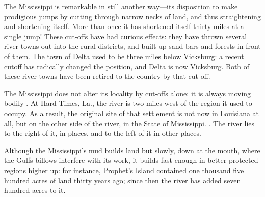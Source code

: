 \documentclass[../../../demo.tex]{novelettesubdoc}
\begin{document}
The Mississippi is remarkable in still another way---its disposition to
make prodigious jumps by cutting through narrow necks of land, and thus
straightening and shortening itself. More than once it has shortened
itself thirty miles at a single jump! These cut-offs have had curious
effects: they have thrown several river towns out into the rural
districts, and built up sand bars and forests in front of them. The town
of Delta used to be three miles below Vicksburg: a recent cutoff has
radically changed the position, and Delta is now 
Vicksburg. Both of these river towns have been retired to the country by that
cut-off.

The Mississippi does not alter its locality by cut-offs alone: it
is always moving bodily . At Hard Times, La., the river is two
miles west of the region it used to occupy. As a result, the original site of
that settlement is not now in Louisiana at all, but on the other side of
the river, in the State of Mississippi. . The river lies to the right of it, in places, and to the
left of it in other places.

Although the Mississippi's mud builds land but slowly, down at the
mouth, where the Gulfs billows interfere with its work, it builds fast
enough in better protected regions higher up: for instance, Prophet's
Island contained one thousand five hundred acres of land thirty years
ago; since then the river has added seven hundred acres to it.
\end{document}
